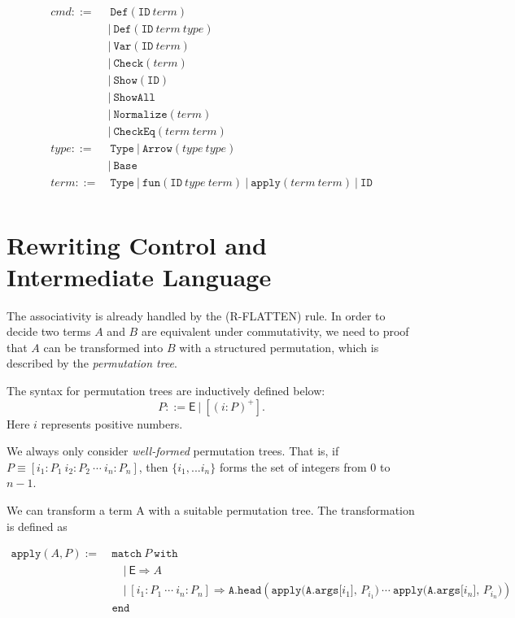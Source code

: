 \documentclass{article}
\begin{document}
\begin{align*}
    cmd ::=&\ \texttt{Def}(\texttt{ID}\ term) \\
        &|\ \texttt{Def}(\texttt{ID}\ term\ type) \\
        &|\ \texttt{Var}(\texttt{ID}\ term) \\
        &|\ \texttt{Check}(term) \\
        &|\ \texttt{Show}(\texttt{ID}) \\
        &|\ \texttt{ShowAll} \\
        &|\ \texttt{Normalize}(term) \\
        &|\ \texttt{CheckEq}(term\ term) \\
    type ::=&\ \texttt{Type}\ |\ \texttt{Arrow}(type\ type) \\
            &|\ \texttt{Base} \\
    term ::=&\ \texttt{Type}\ |\ \texttt{fun}(\texttt{ID}\ type\ term)\ |\ \texttt{apply}(term\ term)\ |\ \texttt{ID} \\
\end{align*}


\section{Rewriting Control and Intermediate Language}
The associativity is already handled by the (R-FLATTEN) rule. In order to decide two terms $A$ and $B$ are equivalent under commutativity, we need to proof that $A$ can be transformed into $B$ with a structured permutation, which is described by the \textit{permutation tree}.

\begin{definition}
    The syntax for permutation trees are inductively defined below:
    \[
    P ::= \mathsf{E}\ |\ [(i:P)^+].
    \]
    Here $i$ represents positive numbers.
\end{definition}
We always only consider \textit{well-formed} permutation trees. That is, if $P \equiv [i_1:P_1\ i_2:P_2\ \cdots\ i_n:P_n]$, then $\{i_1, ... i_n\}$ forms the set of integers from $0$ to $n-1$.

We can transform a term A with a suitable permutation tree. The transformation is defined as

\begin{align*}
    \texttt{apply}(A, P) :=\ & \texttt{match}\ P\ \texttt{with} \\
    & \quad |\ \textsf{E} \Rightarrow A \\
    & \quad |\ [i_1:P_1\ \cdots\ i_n:P_n] \Rightarrow \texttt{A.head}(\texttt{apply(A.args[$i_1$], $P_{i_1}$)}\ \cdots\ \texttt{apply(A.args[$i_n$], $P_{i_n}$)}) \\
    & \texttt{end}
\end{align*}




\clearpage



\end{document}
